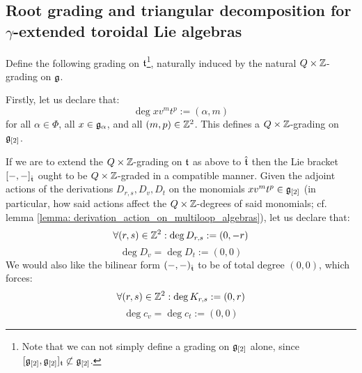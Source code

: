     \subsection{Root grading and triangular decomposition for \texorpdfstring{$\gamma$}{}-extended toroidal Lie algebras}
        \begin{proposition} \label{prop: root_grading_on_extended_toroidal_lie_algebras}
            Define the following grading on $\mathfrak{t}$\footnote{Note that we can not simply define a grading on $\mathfrak{g}_{[2]}$ alone, since $[\mathfrak{g}_{[2]}, \mathfrak{g}_{[2]}]_{\mathfrak{t}} \not \subset \mathfrak{g}_{[2]}$.}, naturally induced by the natural $Q \x \Z$-grading on $\mathfrak{g}$.
            
            Firstly, let us declare that:
                $$\deg x v^m t^p := (\alpha, m)$$
            for all $\alpha \in \Phi$, all $x \in \mathfrak{g}_{\alpha}$, and all $(m, p) \in \mathbb{Z}^2$. This defines a $Q \x \Z$-grading on $\mathfrak{g}_{[2]}$. 
            
            If we are to extend the $Q \x \Z$-grading on $\mathfrak{t}$ as above to $\hat{\mathfrak{t}}$ then the Lie bracket $[-, -]_{\hat{\mathfrak{t}}}$ ought to be $Q \x \Z$-graded in a compatible manner. Given the adjoint actions of the derivations $D_{r, s}, D_v, D_t$ on the monomials $x v^m t^p \in \mathfrak{g}_{[2]}$ (in particular, how said actions affect the $Q \x \Z$-degrees of said monomials; cf. lemma \ref{lemma: derivation_action_on_multiloop_algebras}), let us declare that:
                $$\forall (r, s) \in \mathbb{Z}^2: \deg D_{r, s} := (0, -r)$$
                $$\deg D_v = \deg D_t := (0, 0)$$
            We would also like the bilinear form $(-, -)_{\hat{\mathfrak{t}}}$ to be of total degree $(0, 0)$, which forces:
                $$\forall (r, s) \in \mathbb{Z}^2: \deg K_{r, s} := (0, r)$$
                $$\deg c_v = \deg c_t := (0, 0)$$
        \end{proposition}
